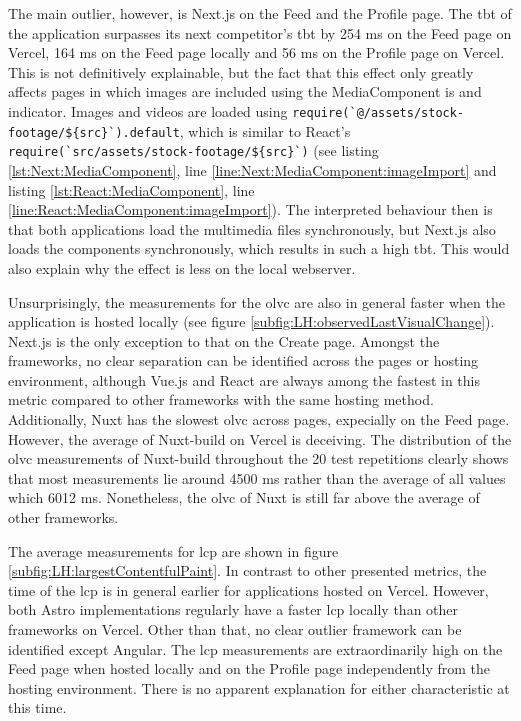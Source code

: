 \documentclass[a4paper, 12pt]{article}
\begin{document}
The main outlier, however, is Next.js on the Feed and the Profile page.
The \acrshort{tbt} of the application surpasses its next competitor's \acrshort{tbt} by 254 ms on the Feed page on Vercel, 164 ms on the Feed page locally and 56 ms on the Profile page on Vercel.
This is not definitively explainable, but the fact that this effect only greatly affects pages in which images are included using the MediaComponent is and indicator.
Images and videos are loaded using \lstinline|require(`@/assets/stock-footage/${src}`).default|, which is similar to React's \lstinline|require(`src/assets/stock-footage/${src}`)| (see listing \ref{lst:Next:MediaComponent}, line \ref{line:Next:MediaComponent:imageImport} and listing \ref{lst:React:MediaComponent}, line \ref{line:React:MediaComponent:imageImport}).
The interpreted behaviour then is that both applications load the multimedia files synchronously, but Next.js also loads the components synchronously, which results in such a high \acrlong{tbt}.
This would also explain why the effect is less on the local webserver.

Unsurprisingly, the measurements for the \acrfull{olvc} are also in general faster when the application is hosted locally (see figure \ref{subfig:LH:observedLastVisualChange}).
Next.js is the only exception to that on the Create page.
Amongst the frameworks, no clear separation can be identified across the pages or hosting environment, although Vue.js and React are always among the fastest in this metric compared to other frameworks with the same hosting method.
Additionally, Nuxt has the slowest \acrshort{olvc} across pages, expecially on the Feed page.
However, the average of Nuxt-build on Vercel is deceiving.
The distribution of the \acrshort{olvc} measurements of Nuxt-build throughout the 20 test repetitions clearly shows that most measurements lie around 4500 ms rather than the average of all values which 6012 ms.
Nonetheless, the \acrshort{olvc} of Nuxt is still far above the average of other frameworks.

The average measurements for \acrfull{lcp} are shown in figure \ref{subfig:LH:largestContentfulPaint}.
In contrast to other presented metrics, the time of the \acrshort{lcp} is in general earlier for applications hosted on Vercel.
However, both Astro implementations regularly have a faster \acrshort{lcp} locally than other frameworks on Vercel.
Other than that, no clear outlier framework can be identified except Angular.
The \acrshort{lcp} measurements are extraordinarily high on the Feed page when hosted locally and on the Profile page independently from the hosting environment.
There is no apparent explanation for either characteristic at this time.
\end{document}
